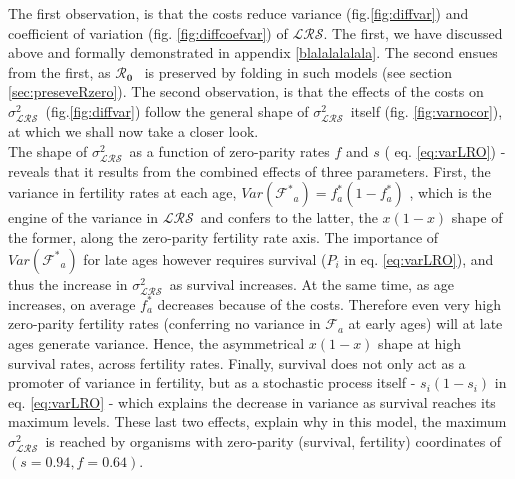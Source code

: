 \documentclass[10pt,a4paper]{article}
\newcommand{\Rzero}{$\boldsymbol{\mathcal{R}_{0}}$  }
\newcommand{\LRO}{$\mathcal{LRS}$}
\newcommand{\vLRO}{$\sigma_{\mathrm{\mathcal{LRS}}}^2$}
\begin{document}
The first observation, is that the costs reduce variance (fig.\ref{fig:diffvar})  and coefficient of variation (fig. \ref{fig:diffcoefvar}) of \LRO. The first, we have discussed above and formally demonstrated in appendix \ref{blalalalalala}. The second ensues from the first, as \Rzero\ is preserved by folding in such models (see section \ref{sec:preseveRzero}). The second observation, is that the effects of the costs on \vLRO\ (fig.\ref{fig:diffvar}) follow the general shape of \vLRO\ itself (fig. \ref{fig:varnocor}), at which we shall now take a closer look. \\

The shape of \vLRO\ as a function of zero-parity rates $f$ and $s$ ( eq. \ref{eq:varLRO}) - reveals that it results from the combined effects of three parameters. First, the variance in fertility rates at each age, $Var(\mathcal{F^{*}}_{a})=f^{*}_{a}(1-f^{*}_{a})$ , which is the engine of the variance in \LRO\ and confers to the latter, the $x(1-x)$ shape of the former, along the zero-parity fertility rate axis. The importance of $Var(\mathcal{F^{*}}_{a})$ for late ages however requires survival ($P_{i}$ in eq. \ref{eq:varLRO}), and thus the increase in \vLRO\ as survival increases. At the same time, as age increases, on average $f^{*}_{a}$ decreases because of the costs. Therefore even very high zero-parity fertility rates (conferring no variance in $\mathcal{F}_{a}$ at early ages) will at late ages generate variance. Hence, the asymmetrical $x(1-x)$ shape at high survival rates, across fertility rates. Finally, survival does not only act as a promoter of variance in fertility, but as a stochastic process itself - $s_{i}(1-s_{i})$ in eq. \ref{eq:varLRO} - which explains the decrease in variance as survival reaches its maximum levels. These last two effects, explain why in this model, the maximum \vLRO\ is reached by organisms with zero-parity (survival, fertility) coordinates of $(s=0.94,f=0.64)$.\\
\end{document}
